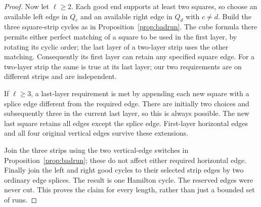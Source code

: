 \documentclass[11pt]{article}
\theoremstyle{remark}
\numberwithin{equation}{section}
\numberwithin{table}{section}
\begin{document}
\begin{proof}
Now let $\ell\ge2$. Each good end supports at least two squares, so
choose an available left edge in $Q_c$ and an available right edge in
$Q_d$ with $c\ne d$. Build the three square-strip cycles as in
Proposition~\ref{prop:badrun}. The cube formula there permits either
perfect matching of a square to be used in the first layer, by rotating
its cyclic order; the last layer of a two-layer strip uses the other
matching. Consequently its first layer can retain any specified square
edge. For a two-layer strip the same is true at its last layer; our two
requirements are on different strips and are independent.

If $\ell\ge3$, a last-layer requirement is met by appending each new
square with a splice edge different from the required edge. There are
initially two choices and subsequently three in the current last
layer, so this is always possible. The new last square retains all
edges except the splice edge. First-layer horizontal edges and all
four original vertical edges survive these extensions.

Join the three strips using the two vertical-edge switches in
Proposition~\ref{prop:badrun}; these do not affect either required
horizontal edge. Finally join the left and right good cycles to their
selected strip edges by two ordinary edge splices. The result is one
Hamilton cycle. The reserved edges were never cut. This proves the
claim for every length, rather than just a bounded set of runs.
\end{proof}
\end{document}
